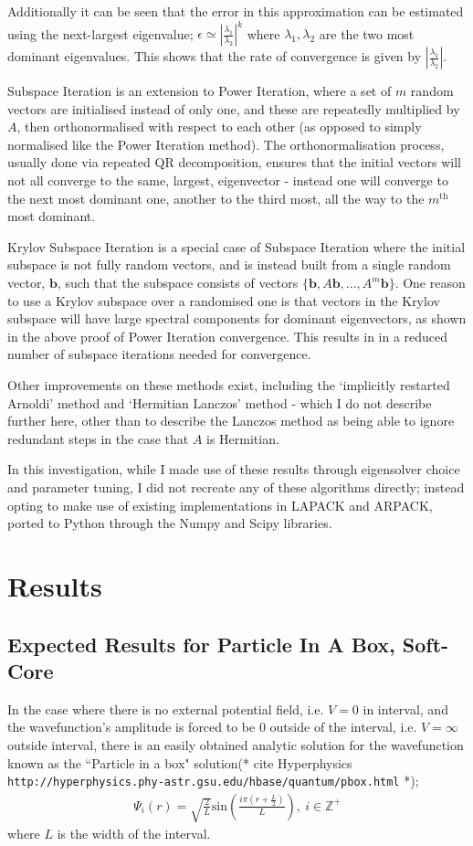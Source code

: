 Additionally it can be seen that the error in this approximation can be estimated using the next-largest eigenvalue; $\epsilon \simeq |\frac{\lambda_1}{\lambda_2}|^{k}$ where $\lambda_1, \lambda_2$ are the two most dominant eigenvalues. This shows that the rate of convergence is given by $|\frac{\lambda_1}{\lambda_2}|$.


Subspace Iteration is an extension to Power Iteration, where a set of $m$ random vectors are initialised instead of only one, and these are repeatedly multiplied by $A$, then orthonormalised with respect to each other (as opposed to simply normalised like the Power Iteration method). The orthonormalisation process, usually done via repeated QR decomposition, ensures that the initial vectors will not all converge to the same, largest, eigenvector - instead one will converge to the next most dominant one, another to the third most, all the way to the $m^{\text{th}}$ most dominant.


Krylov Subspace Iteration is a special case of Subspace Iteration where the initial subspace is not fully random vectors, and is instead built from a single random vector, $\mathbf{b}$, such that the subspace consists of vectors $\{\mathbf{b}, A\mathbf{b},...,A^{m}\mathbf{b}\}$. One reason to use a Krylov subspace over a randomised one is that vectors in the Krylov subspace will have large spectral components for dominant eigenvectors, as shown in the above proof of Power Iteration convergence. This results in in a reduced number of subspace iterations needed for convergence.


Other improvements on these methods exist, including the `implicitly restarted Arnoldi' method and `Hermitian Lanczos' method - which I do not describe further here, other than to describe the Lanczos method as being able to ignore redundant steps in the case that $A$ is Hermitian.


In this investigation, while I made use of these results through eigensolver choice and parameter tuning, I did not recreate any of these algorithms directly; instead opting to make use of existing implementations in LAPACK and ARPACK, ported to Python through the Numpy and Scipy libraries.

\section{Results}
\subsection{Expected Results for Particle In A Box, Soft-Core}
In the case where there is no external potential field, i.e. $V=0$ in interval, and the wavefunction's amplitude is forced to be $0$ outside of the interval, i.e. $V=\infty$ outside interval, there is an easily obtained analytic solution for the wavefunction known as the ``Particle in a box" solution(* cite Hyperphysics \texttt{http://hyperphysics.phy-astr.gsu.edu/hbase/quantum/pbox.html} *); 
\begin{align*}
	\Psi_{i}\left(r\right) = \sqrt{\frac{2}{L}}\text{sin}\left(\frac{i\pi \left(r + \frac{L}{2}\right)}{L}\right),\ i\in \mathbb{Z}^{+}
\end{align*}
where $L$ is the width of the interval.


